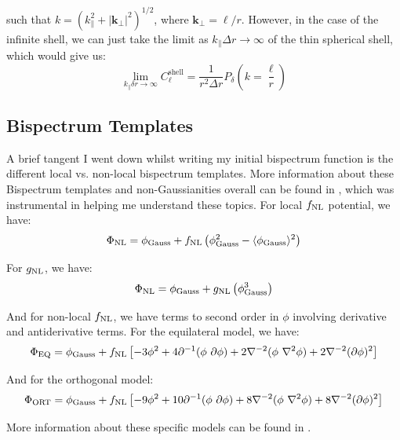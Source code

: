 \documentclass[11pt]{article}
\renewcommand{\_}[1]{\underline{ #1 }}
\begin{document}
{such that $k = (k_{\parallel}^2 + |\mathbf{k}_{\perp}|^2)^{1/2}$, where $\mathbf{k}_{\perp} = \ell/r$. However, in the case of the infinite shell, we can just take the limit as $k_{\parallel}\Delta r\to\infty$ of the thin spherical shell, which would give us:
\begin{equation}
    \lim_{k_{\parallel}\delta r\to\infty} C_{\ell}^{\text{shell}} = \frac{1}{r^2\Delta r} P_{\delta}\left(k=\frac{\ell}{r}\right)
\end{equation}


\subsection{Bispectrum Templates}

A brief tangent I went down whilst writing my initial bispectrum function is the different local vs. non-local bispectrum templates. More information about these Bispectrum templates and non-Gaussianities overall can be found in \cite{Woods_2018}, which was instrumental in helping me understand these topics. For local $f_{\rm NL}$ potential, we have:
\begin{equation}
    \Phi_{\rm NL} = \phi_{\rm Gauss} + f_{\rm NL} \left(\phi_{\rm Gauss}^2 - \langle\phi_{\rm Gauss}\rangle^2\right)
\end{equation}

For $g_{\rm NL}$, we have:
\begin{equation}
    \Phi_{\rm NL} = \phi_{\rm Gauss} + g_{\rm NL}\left(\phi_{\rm Gauss}^3\right)
\end{equation}

And for non-local $f_{\rm NL}$, we have terms to second order in $\phi$ involving derivative and antiderivative terms. For the equilateral model, we have:
\begin{equation}
    \Phi_{\rm EQ} = \phi_{\rm Gauss} + f_{\rm NL}\left[-3\phi^2 + 4 \partial^{-1}(\phi\ \partial\phi) + 2 \nabla^{-2}(\phi\  \nabla^2\phi) + 2 \nabla^{-2}(\partial \phi)^2 \right]
\end{equation}

And for the orthogonal model:
\begin{equation}
    \Phi_{\rm ORT} = \phi_{\rm Gauss} + f_{\rm NL}\left[-9\phi^2 + 10 \partial^{-1}(\phi\ \partial\phi) + 8 \nabla^{-2}(\phi\  \nabla^2\phi) + 8 \nabla^{-2}(\partial\phi)^2 \right]
\end{equation}

More information about these specific models can be found in \cite{Scoccimarro_2012}.

}
\end{document}
